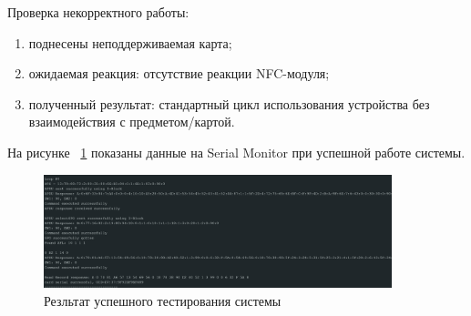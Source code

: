 Проверка некорректного работы:
\begin{enumerate}
    \item поднесены неподдерживаемая карта;
    \item ожидаемая реакция: отсутствие реакции NFC-модуля;
    \item полученный результат: стандартный цикл использования устройства без взаимодействия с предметом/картой.
\end{enumerate}

На рисунке ~\ref{fig:test_success} показаны данные на Serial Monitor при успешной работе системы.

\begin{figure}[H]
    \centering
    \includegraphics[width=0.9\textwidth]{images/design/test_success}
    \caption{\centering Резльтат успешного тестирования системы}
    \label{fig:test_success}
\end{figure}
